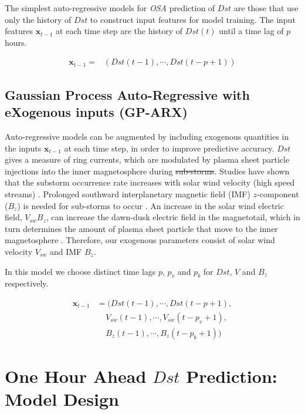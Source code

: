 \documentclass{article}
\providecommand{\DIFadd}[1]{{\protect\color{blue}\uwave{#1}}} %
\providecommand{\DIFdel}[1]{{\protect\color{red}\sout{#1}}}                      %
\providecommand{\DIFaddbegin}{} %
\providecommand{\DIFaddend}{} %
\providecommand{\DIFdelbegin}{} %
\providecommand{\DIFdelend}{} %
\newcommand{\DIFscaledelfig}{0.5}
\newlength{\DIFdelgraphicswidth} %
\newlength{\DIFdelgraphicsheight} %
\newcommand{\DIFaddincludegraphics}[2][]{{\color{blue}\fbox{\DIFOincludegraphics[#1]{#2}}}} %
\newcommand{\DIFdelincludegraphics}[2][]{%
\sbox{\DIFdelgraphicsbox}{\DIFOincludegraphics[#1]{#2}}%
\settoboxwidth{\DIFdelgraphicswidth}{\DIFdelgraphicsbox} %
\settoboxtotalheight{\DIFdelgraphicsheight}{\DIFdelgraphicsbox} %
\scalebox{\DIFscaledelfig}{%
\parbox[b]{\DIFdelgraphicswidth}{\usebox{\DIFdelgraphicsbox}\\[-\baselineskip] \rule{\DIFdelgraphicswidth}{0em}}\llap{\resizebox{\DIFdelgraphicswidth}{\DIFdelgraphicsheight}{%
\setlength{\unitlength}{\DIFdelgraphicswidth}%
\begin{picture}(1,1)%
\thicklines\linethickness{2pt} %
{\color[rgb]{1,0,0}\put(0,0){\framebox(1,1){}}}%
{\color[rgb]{1,0,0}\put(0,0){\line( 1,1){1}}}%
{\color[rgb]{1,0,0}\put(0,1){\line(1,-1){1}}}%
\end{picture}%
}\hspace*{3pt}}} %
} %
\DeclareRobustCommand{\DIFaddbegin}{\DIFOaddbegin \let\includegraphics\DIFaddincludegraphics} %
\DeclareRobustCommand{\DIFaddend}{\DIFOaddend \let\includegraphics\DIFOincludegraphics} %
\DeclareRobustCommand{\DIFdelbegin}{\DIFOdelbegin \let\includegraphics\DIFdelincludegraphics} %
\DeclareRobustCommand{\DIFdelend}{\DIFOaddend \let\includegraphics\DIFOincludegraphics} %
\begin{document}
The simplest auto-regressive models for \emph{OSA} prediction of $Dst$ are those that use only the history of $Dst$ to construct input features for model training. The input features $\mathbf{x}_{t-1}$ at each time step are the history of $Dst(t)$ until a time lag of $p$ hours.

\begin{align*}
    \mathbf{x}_{t-1} = & \left(Dst(t-1), \cdots , Dst(t-p+1)\right)
\end{align*}

\subsection{Gaussian Process Auto-Regressive with eXogenous inputs (GP-ARX)} \label{sec:gparx}

Auto-regressive models can be augmented by including exogenous quantities in the inputs $\mathbf{x}_{t-1}$ at each time step, in order to improve predictive accuracy. $Dst$ gives a measure of ring currents, which are modulated by plasma sheet particle injections into the inner magnetosphere during \DIFdelbegin \DIFdel{sub-storms}\DIFdelend \DIFaddbegin \DIFadd{substorms}\DIFaddend . Studies have shown that the substorm occurrence rate increases with solar wind velocity (high speed streams) \citet{Kissinger2011,Newell2016}. Prolonged southward interplanetary magnetic field (IMF) $z$-component ($B_z$) is needed for sub-storms to occur \citet{McPherron1986}. An increase in the solar wind electric field, $V_{sw}B_z$, can increase the dawn-dusk electric field in the magnetotail, which in turn determines the amount of plasma sheet particle that move to the inner magnetosphere \citet{Friedel2001}. Therefore, our exogenous parameters consist of solar wind velocity $V_{sw}$ and IMF $B_z$.   

In this model we choose distinct time lags $p$, $p_{v}$ and $p_{b}$ for $Dst$, $V$ and $B_z$ respectively.

\begin{align*}
       \mathbf{x}_{t-1} & = (Dst(t-1), \cdots , Dst(t-p+1), \\
        & \ \ \ \ \  V_{sw}(t-1), \cdots, V_{sw}(t-p_{v}+1),\\
        & \ \ \ \ \  B_{z}(t-1), \cdots, B_{z}(t-p_{b}+1))
\end{align*}

\section{One Hour Ahead $Dst$ Prediction: Model Design}\label{sec:modeldesign}
\end{document}
